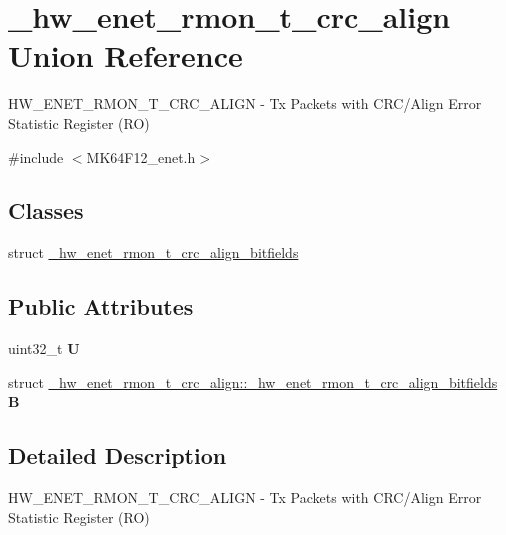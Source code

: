 \hypertarget{union__hw__enet__rmon__t__crc__align}{}\section{\+\_\+hw\+\_\+enet\+\_\+rmon\+\_\+t\+\_\+crc\+\_\+align Union Reference}
\label{union__hw__enet__rmon__t__crc__align}


H\+W\+\_\+\+E\+N\+E\+T\+\_\+\+R\+M\+O\+N\+\_\+\+T\+\_\+\+C\+R\+C\+\_\+\+A\+L\+I\+GN -\/ Tx Packets with C\+R\+C/\+Align Error Statistic Register (RO)  




{\ttfamily \#include $<$M\+K64\+F12\+\_\+enet.\+h$>$}

\subsection*{Classes}
\begin{DoxyCompactItemize}
\item 
struct \hyperlink{struct__hw__enet__rmon__t__crc__align_1_1__hw__enet__rmon__t__crc__align__bitfields}{\+\_\+hw\+\_\+enet\+\_\+rmon\+\_\+t\+\_\+crc\+\_\+align\+\_\+bitfields}
\end{DoxyCompactItemize}
\subsection*{Public Attributes}
\begin{DoxyCompactItemize}
\item 
uint32\+\_\+t {\bfseries U}\hypertarget{union__hw__enet__rmon__t__crc__align_a017f43ac54d8dbc35af0df22ac7401d0}{}\label{union__hw__enet__rmon__t__crc__align_a017f43ac54d8dbc35af0df22ac7401d0}

\item 
struct \hyperlink{struct__hw__enet__rmon__t__crc__align_1_1__hw__enet__rmon__t__crc__align__bitfields}{\+\_\+hw\+\_\+enet\+\_\+rmon\+\_\+t\+\_\+crc\+\_\+align\+::\+\_\+hw\+\_\+enet\+\_\+rmon\+\_\+t\+\_\+crc\+\_\+align\+\_\+bitfields} {\bfseries B}\hypertarget{union__hw__enet__rmon__t__crc__align_a8c6ebc5669135e597f26370fc74cbb3f}{}\label{union__hw__enet__rmon__t__crc__align_a8c6ebc5669135e597f26370fc74cbb3f}

\end{DoxyCompactItemize}


\subsection{Detailed Description}
H\+W\+\_\+\+E\+N\+E\+T\+\_\+\+R\+M\+O\+N\+\_\+\+T\+\_\+\+C\+R\+C\+\_\+\+A\+L\+I\+GN -\/ Tx Packets with C\+R\+C/\+Align Error Statistic Register (RO) 

